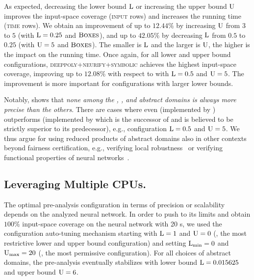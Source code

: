 As expected, decreasing the lower bound $\textup{L}$ or increasing the upper bound $\textup{U}$ improves the input-space coverage (\textsc{input} rows) and increases the running time (\textsc{time} rows). We obtain an improvement of up to $12.44\%$ by increasing $\textup{U}$ from $3$ to $5$ (with $\textup{L} = 0.25$ and $\textsc{Boxes}$), and up to $42.05\%$ by decreasing $\textup{L}$ from $0.5$ to $0.25$ (with $\textup{U} = 5$ and $\textsc{Boxes}$). The smaller is $\textup{L}$ and the larger is $\textup{U}$, the higher is the impact on the running time. Once again, for all lower and upper bound configurations, \textsc{deeppoly+neurify+symbolic} achieves the highest input-space coverage, improving up to $12.08\%$ with respect to \deeppoly{} with $\textup{L} = 0.5$ and $\textup{U} = 5$. The improvement is more important for configurations with larger lower bounds.

Notably,  shows that \emph{none among the \symbolic, \deeppoly, and \neurify{} abstract domains is always more precise than the others}. There are cases where even \symbolic{} (implemented by ) outperforms \neurify{} (implemented by  which is the successor of \cite{Wang2018b} and is believed to be strictly superior to its predecessor), e.g., configuration $\textup{L}=0.5$ and $\textup{U}=5$. We thus argue
for using reduced products of abstract domains also in other contexts beyond fairness certification, e.g., verifying local robustness~ or verifying functional properties of neural networks~.



\subsection{Leveraging Multiple CPUs.}
The optimal pre-analysis configuration in terms of precision or scalability depends on the analyzed neural network.
%
In order to push \libra{} to its limits and obtain $100\%$ input-space coverage on the neural network with 20 \relu{}s, we used the configuration auto-tuning mechanism starting with $\textup{L} = 1$ and $\textup{U} = 0$ (\ie, the most restrictive lower and upper bound configuration) and setting $\textup{L}_{\min} = 0$ and $\textup{U}_{\max} = 20$ (\ie, the most permissive configuration).
For all choices of abstract domains, the pre-analysis eventually stabilizes with lower bound $\textup{L} = 0.015625$ and upper bound $\textup{U} = 6$.


